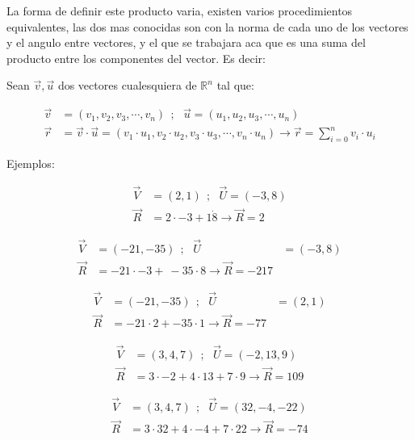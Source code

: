     La forma de definir este producto varia, existen varios procedimientos
    equivalentes, las dos mas conocidas son con la norma de cada uno de los vectores
    y el angulo entre vectores, y el que se trabajara aca que es una suma del
    producto entre los componentes del vector. Es decir:

    Sean $\vec{v},\vec{u}$ dos vectores cualesquiera de $\mathbb{R}^n$ tal que:

    \begin{align*}
        \vec{v}&=(v_1,v_2,v_3,\cdots,v_n) \ \ ;\ \ \ \vec{u}=(u_1,u_2,u_3,\cdots,u_n)\\
        \vec{r}&=\vec{v}\cdot\vec{u}= (v_1\cdot u_1,v_2 \cdot u_2,v_3 \cdot u_3,\cdots,v_n \cdot u_n)\rightarrow
        \vec{r}= \sum_{i=0}^{n} v_i\cdot u_i
    \end{align*}


    Ejemplos:

    \begin{align*}
        \vec{V}& =(2,1) \ \ ;\ \ \  \vec{U} =(-3,8)		\\
        \vec{R}&= 2\cdot-3 +1\dot8   \rightarrow \vec{R}= 2
    \end{align*}

    \begin{align*}
        \vec{V}& =(-21,-35)  \ \ ;\ \ \  \vec{U} &=(-3,8)		\\
        \vec{R}&= -21\cdot-3 +\ -35\cdot8    \rightarrow \vec{R}= -217
    \end{align*}

    \begin{align*}
        \vec{V}& =(-21,-35)  \ \ ;\ \ \ \vec{U} &=(2,1)		\\
        \vec{R}&= -21\cdot2 + -35\cdot1   \rightarrow \vec{R}= -77
    \end{align*}




    \begin{align*}
        \vec{V}& =(3,4,7)   \ \ ;\ \ \  \vec{U} =(-2,13,9)		\\
        \vec{R}&= 3\cdot-2 +4\cdot13 +7\cdot9   \rightarrow \vec{R} = 109
    \end{align*}

    \begin{align*}
        \vec{V}& =(3,4,7)  \ \ ;\ \ \  \vec{U} =(32,-4,-22)		\\
        \vec{R}&= 3\cdot32 + 4\cdot-4 +7\cdot22    \rightarrow \vec{R} = -74
    \end{align*}


